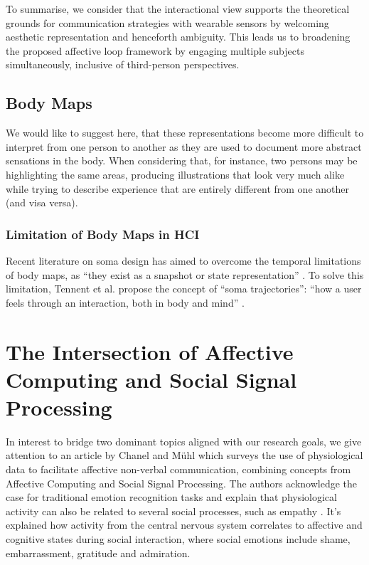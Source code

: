 To summarise, we consider that the interactional view supports the theoretical grounds for communication strategies with wearable sensors by welcoming aesthetic representation and henceforth ambiguity. This leads us to broadening the proposed affective loop framework by engaging multiple subjects simultaneously, inclusive of third-person perspectives.

\subsection{Body Maps}

 We would like to suggest here, that these representations become more difficult to interpret from one person to another as they are used to document more abstract sensations in the body. When considering that, for instance, two persons may be highlighting the same areas, producing illustrations that look very much alike while trying to describe experience that are entirely different from one another (and visa versa).

 \subsubsection{Limitation of Body Maps in HCI}
 Recent literature on soma design has aimed to overcome the temporal limitations of body maps, as “they exist as a snapshot or state representation” \cite{tennent_articulating_2021}. To solve this limitation, Tennent et al. propose the concept of “soma trajectories”: “how a user feels through an interaction, both in body and mind” \cite{tennent_articulating_2021}.

\section{The Intersection of Affective Computing and Social Signal Processing}
\label{lit_reivew:ssp}

In interest to bridge two dominant topics aligned with our research goals, we give attention to an article by Chanel and Mühl \cite{chanel_connecting_2015} which surveys the use of physiological data to facilitate affective non-verbal communication, combining concepts from Affective Computing and Social Signal Processing.
The authors acknowledge the case for traditional emotion recognition tasks and explain that physiological activity can also be related to several social processes, such as empathy \cite{levenson_empathy_1992}. It's explained how activity from the central nervous system correlates to affective and cognitive states during social interaction, where social emotions include shame, embarrassment, gratitude and admiration.


